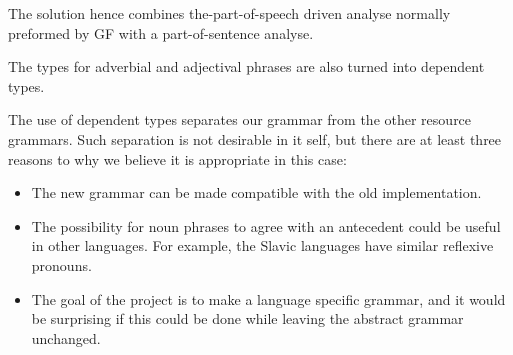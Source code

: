 \documentclass{report}
\begin{document}
The solution hence combines the-part-of-speech driven analyse normally preformed by
GF with a part-of-sentence analyse.

The types for adverbial and adjectival phrases are also turned into dependent
types.

The use of dependent types separates our grammar from the other resource grammars. Such separation
is not desirable in it self, but there are at least three reasons to why we
believe it is appropriate in this case:
\begin{itemize}
\item The new grammar can be made compatible with the old implementation.
\item The possibility for noun phrases to agree with an antecedent 
      could be useful in other languages. For example, the Slavic languages
      have similar reflexive pronouns.
\item The goal of the project is to make a language specific grammar, and it would be surprising if this could be
      done while leaving the abstract grammar unchanged.
\end{itemize}
\end{document}
